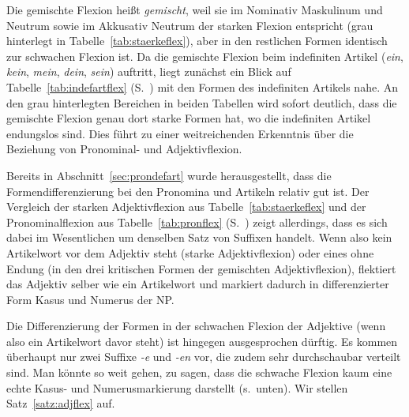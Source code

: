 Die gemischte Flexion heißt \textit{gemischt}, weil sie im Nominativ Maskulinum und Neutrum sowie im Akkusativ Neutrum der starken Flexion entspricht (grau hinterlegt in Tabelle~\ref{tab:staerkeflex}), aber in den restlichen Formen identisch zur schwachen Flexion ist.
Da die gemischte Flexion beim indefiniten Artikel (\textit{ein}, \textit{kein}, \textit{mein}, \textit{dein}, \textit{sein}) auftritt, liegt zunächst ein Blick auf Tabelle~\ref{tab:indefartflex} (S.~\pageref{tab:indefartflex}) mit den Formen des indefiniten Artikels nahe.
An den grau hinterlegten Bereichen in beiden Tabellen wird sofort deutlich, dass die gemischte Flexion genau dort starke Formen hat, wo die indefiniten Artikel endungslos sind.
Dies führt zu einer weitreichenden Erkenntnis über die Beziehung von Pronominal- und Adjektivflexion.

Bereits in Abschnitt~\ref{sec:prondefart} wurde herausgestellt, dass die Formendifferenzierung bei den Pronomina und Artikeln relativ gut ist.
Der Vergleich der starken Adjektivflexion aus Tabelle~\ref{tab:staerkeflex} und der Pronominalflexion aus Tabelle~\ref{tab:pronflex} (S.~\pageref{tab:pronflex}) zeigt allerdings, dass es sich dabei im Wesentlichen um denselben Satz von Suffixen handelt.
Wenn also kein Artikelwort vor dem Adjektiv steht (starke Adjektivflexion) oder eines ohne Endung (in den drei kritischen Formen der gemischten Adjektivflexion), flektiert das Adjektiv selber wie ein Artikelwort und markiert dadurch in differenzierter Form Kasus und Numerus der NP.

Die Differenzierung der Formen in der schwachen Flexion der Adjektive (wenn also ein Artikelwort davor steht) ist hingegen ausgesprochen dürftig.
Es kommen überhaupt nur zwei Suffixe \textit{-e} und \textit{-en} vor, die zudem sehr durchschaubar verteilt sind.
Man könnte so weit gehen, zu sagen, dass die schwache Flexion kaum eine echte Kasus- und Numerusmarkierung darstellt (s.\ unten).
Wir stellen Satz~\ref{satz:adjflex} auf.

\Np



